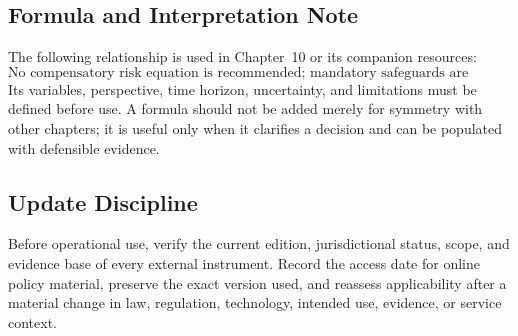 \subsection{Formula and Interpretation Note}
The following relationship is used in Chapter~10 or its companion resources:
\begin{equation}
\text{No compensatory risk equation is recommended; mandatory safeguards are assessed as gates.}
\label{eq:comp-ch10-reference-formula}
\end{equation}
Its variables, perspective, time horizon, uncertainty, and limitations must be
defined before use. A formula should not be added merely for symmetry with other
chapters; it is useful only when it clarifies a decision and can be populated with
defensible evidence.

\subsection{Update Discipline}
Before operational use, verify the current edition, jurisdictional status, scope,
and evidence base of every external instrument. Record the access date for online
policy material, preserve the exact version used, and reassess applicability after a
material change in law, regulation, technology, intended use, evidence, or service
context.
